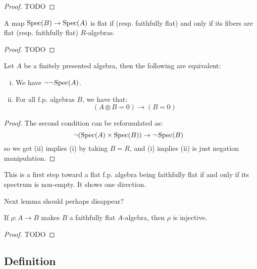 \begin{proof}
TODO
\end{proof}

\begin{lemma}
A map $\operatorname{Spec}(B)\to \operatorname{Spec}(A)$ is flat if (resp. faithfully flat) and only if its fibers are flat (resp. faithfully flat) $R$-algebras.
\end{lemma}

\begin{proof}
TODO
\end{proof}

\begin{lemma}
Let $A$ be a finitely presented algebra, then the following are equivalent:
\begin{enumerate}[(i)]
\item We have $\neg\neg\operatorname{Spec}(A)$.
\item For all f.p. algebras $B$, we have that:
\[(A\otimes B = 0) \to (B=0)\]
\end{enumerate}
\end{lemma}

\begin{proof}
The second condition can be reformulated as:
\[\neg(\operatorname{Spec}(A)\times\operatorname{Spec}(B))\to \neg\operatorname{Spec}(B)\]
so we get (ii) implies (i) by taking $B=R$, and (i) implies (ii) is just negation manipulation.
\end{proof}

This is a first step toward a flat f.p. algebra being faithfully flat if and only if its spectrum is non-empty. It shows one direction.

Next lemma should perhaps disappear?

\begin{lemma}
If $\rho: A\to B$ makes $B$ a faithfully flat $A$-algebra, then $\rho$ is injective.
\end{lemma}

\begin{proof}
TODO
\end{proof}

\subsection{Definition}

